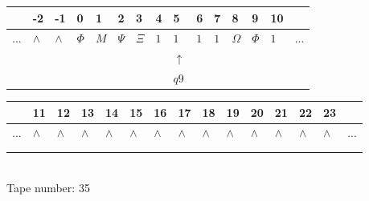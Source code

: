 \documentclass[11pt]{article}
\begin{document}
\begin{table}[H]
\centering
\begin{tabular}{lllllllllllllll}
 & -2 & -1 & 0 & 1 & 2 & 3 & 4 & 5 & 6 & 7 & 8 & 9 & 10 & \\
\hline
$...$ & \multicolumn{1}{|l|}{$\wedge$} & \multicolumn{1}{|l|}{$\wedge$} & \multicolumn{1}{|l|}{$\Phi$} & \multicolumn{1}{|l|}{$M$} & \multicolumn{1}{|l|}{$\Psi$} & \multicolumn{1}{|l|}{$\Xi$} & \multicolumn{1}{|l|}{$1$} & \multicolumn{1}{|l|}{$1$} & \multicolumn{1}{|l|}{$1$} & \multicolumn{1}{|l|}{$1$} & \multicolumn{1}{|l|}{$\Omega$} & \multicolumn{1}{|l|}{$\Phi$} & \multicolumn{1}{|l|}{$1$} & $...$\\
\hline
&  &  &  &  &  &  &  & $\uparrow$ &  &  &  &  &  &  \\
&  &  &  &  &  &  &  & $ q9 $ &  &  &  &  &  &  \\
\end{tabular}
\begin{tabular}{lllllllllllllll}
 & 11 & 12 & 13 & 14 & 15 & 16 & 17 & 18 & 19 & 20 & 21 & 22 & 23 & \\
\hline
$...$ & \multicolumn{1}{|l|}{$\wedge$} & \multicolumn{1}{|l|}{$\wedge$} & \multicolumn{1}{|l|}{$\wedge$} & \multicolumn{1}{|l|}{$\wedge$} & \multicolumn{1}{|l|}{$\wedge$} & \multicolumn{1}{|l|}{$\wedge$} & \multicolumn{1}{|l|}{$\wedge$} & \multicolumn{1}{|l|}{$\wedge$} & \multicolumn{1}{|l|}{$\wedge$} & \multicolumn{1}{|l|}{$\wedge$} & \multicolumn{1}{|l|}{$\wedge$} & \multicolumn{1}{|l|}{$\wedge$} & \multicolumn{1}{|l|}{$\wedge$} & $...$\\
\hline
&  &  &  &  &  &  &  &  &  &  &  &  &  &  \\
&  &  &  &  &  &  &  &  &  &  &  &  &  &  \\
\end{tabular}
\\
Tape number: 35
\noindent\makebox[\linewidth]{\hdashrule{\textwidth}{1pt}{1pt}}\end{table}
\clearpage
\end{document}
